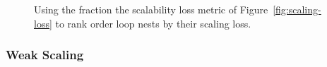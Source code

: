 \documentclass[11pt,letterpaper]{report}
\begin{document}
\begin{figure}[t]
\caption{Using the fraction the scalability loss metric of Figure~\ref{fig:scaling-loss} to rank order loop nests by their scaling loss.}
\label{fig:scaling-loss-2}
\end{figure}


\subsubsection*{Weak Scaling}
\end{document}
